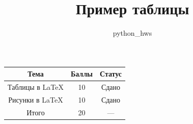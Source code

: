 \documentclass[11pt]{article}
\begin{document}
\title{Пример таблицы}
\author{python\_hws}
\maketitle

\begin{tabular}{|c|c|c|}
\hline
Тема & Баллы & Статус \\
\hline
Таблицы в LaTeX & 10 & Сдано \\
\hline
Рисунки в LaTeX & 10 & Сдано \\
\hline
Итого & 20 & --- \\
\hline
\end{tabular}
\end{document}
